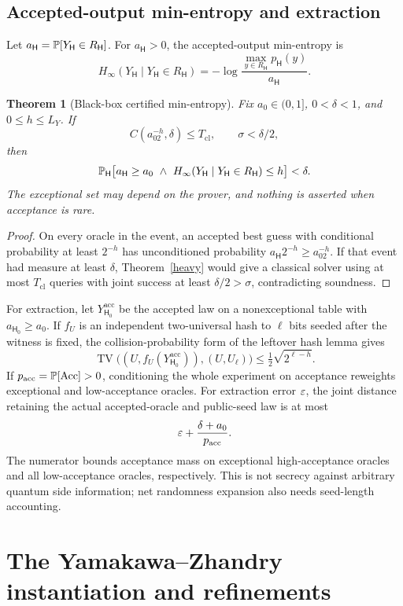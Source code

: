 \documentclass[11pt]{article}
\newtheorem{theorem}{Theorem}[section]
\theoremstyle{definition}\newtheorem{definition}[theorem]{Definition}
\theoremstyle{remark}\newtheorem{remark}[theorem]{Remark}
\DeclareMathOperator{\TV}{TV}\DeclareMathOperator{\FC}{FC}
\begin{document}
\subsection{Accepted-output min-entropy and extraction}
Let \(a_{\mathsf H}=\mathbb P[Y_{\mathsf H}\in R_{\mathsf H}]\). For \(a_{\mathsf H}>0\), the accepted-output min-entropy is
\[
 H_\infty(Y_{\mathsf H}\mid Y_{\mathsf H}\in R_{\mathsf H})=-\log\frac{\max_{y\in R_{\mathsf H}}p_{\mathsf H}(y)}{a_{\mathsf H}}.
\]

\begin{theorem}[Black-box certified min-entropy]\label{thm:entropy}
Fix \(a_0\in(0,1]\), \(0<\delta<1\), and \(0\le h\le L_Y\). If
\[
 C(a_02^{-h},\delta)\le T_{\mathrm{cl}},\qquad\sigma<\delta/2,
\]
then
\[
 \mathbb P_{\mathsf H}\bigl[a_{\mathsf H}\ge a_0\ \wedge\ H_\infty(Y_{\mathsf H}\mid Y_{\mathsf H}\in R_{\mathsf H})\le h\bigr]<\delta.
\]
The exceptional set may depend on the prover, and nothing is asserted when acceptance is rare.
\end{theorem}
\begin{proof}
On every oracle in the event, an accepted best guess with conditional probability at least \(2^{-h}\) has unconditioned probability \(a_{\mathsf H}2^{-h}\ge a_02^{-h}\). If that event had measure at least \(\delta\), Theorem~\ref{heavy} would give a classical solver using at most \(T_{\mathrm{cl}}\) queries with joint success at least \(\delta/2>\sigma\), contradicting soundness.
\end{proof}

For extraction, let \(Y^{\mathrm{acc}}_{\mathsf H_0}\) be the accepted law on a nonexceptional table with \(a_{\mathsf H_0}\ge a_0\). If \(f_U\) is an independent two-universal hash to \(\ell\) bits seeded after the witness is fixed, the collision-probability form of the leftover hash lemma gives
\[
 \TV\bigl((U,f_U(Y^{\mathrm{acc}}_{\mathsf H_0})),(U,U_\ell)\bigr)\le\tfrac12\sqrt{2^{\ell-h}}.
\]
If \(p_{\mathrm{acc}}=\mathbb P[\mathrm{Acc}]>0\), conditioning the whole experiment on acceptance reweights exceptional and low-acceptance oracles. For extraction error \(\varepsilon\), the joint distance retaining the actual accepted-oracle and public-seed law is at most
\[
 \varepsilon+\frac{\delta+a_0}{p_{\mathrm{acc}}}.
\]
The numerator bounds acceptance mass on exceptional high-acceptance oracles and all low-acceptance oracles, respectively. This is not secrecy against arbitrary quantum side information; net randomness expansion also needs seed-length accounting.

\section{The Yamakawa--Zhandry instantiation and refinements}\label{sec:yz}
\end{document}
